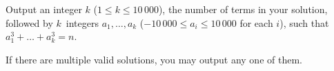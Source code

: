 
    Output an integer $k$ ($1 \leq k \leq 10\,000$), the number of terms in your solution,
    followed by $k$~integers $a_1,\ldots, a_k$ ($-10\,000\leq a_i\leq10\,000$ for each $i$),
    such that $a_1^3 + \dots + a_k^3 = n$.

    If there are multiple valid solutions, you may output any one of them.
